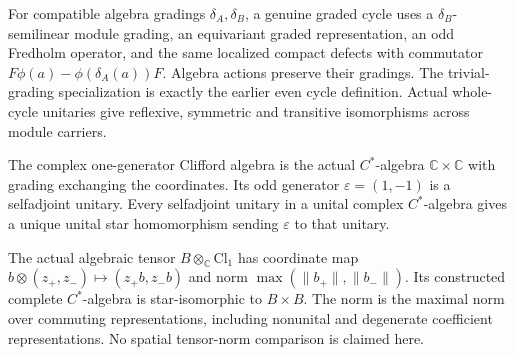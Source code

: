 \begin{definition}\label{def:general-graded-kasparov-cycle}
\leanok
For compatible algebra gradings $\delta_A,\delta_B$, a genuine graded
cycle uses a $\delta_B$-semilinear module grading, an equivariant graded
representation, an odd Fredholm operator, and the same localized compact
defects with commutator
$F\phi(a)-\phi(\delta_A(a))F$. Algebra actions preserve their gradings.
The trivial-grading specialization is exactly the earlier even cycle
definition. Actual whole-cycle unitaries give reflexive, symmetric and
transitive isomorphisms across module carriers.
\end{definition}

\begin{proposition}\label{prop:complex-clifford-one}
\leanok
The complex one-generator Clifford algebra is the actual $C^*$-algebra
$\mathbb C\times\mathbb C$ with grading exchanging the coordinates.
Its odd generator $\varepsilon=(1,-1)$ is a selfadjoint unitary.
Every selfadjoint unitary in a unital complex $C^*$-algebra gives a unique
unital star homomorphism sending $\varepsilon$ to that unitary.
\end{proposition}

\begin{proposition}\label{prop:clifford-coefficient-tensor}
\leanok
The actual algebraic tensor $B\otimes_{\mathbb C}\mathrm{Cl}_1$ has
coordinate map $b\otimes(z_+,z_-)\mapsto(z_+b,z_-b)$ and norm
$\max(\|b_+\|,\|b_-\|)$. Its constructed complete $C^*$-algebra is
star-isomorphic to $B\times B$. The norm is the maximal norm over commuting
representations, including nonunital and degenerate coefficient
representations. No spatial tensor-norm comparison is claimed here.
\end{proposition}

